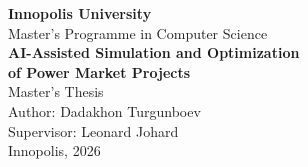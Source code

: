 \documentclass[14pt,a4paper]{extreport}   %
\begin{document}
\begin{titlepage}
\centering
{\Large\textbf{Innopolis University}\\[0.5em]
Master's Programme in Computer Science}\\[3em]
{\LARGE\textbf{AI-Assisted Simulation and Optimization\\
of Power Market Projects}}\\[3em]
{\large Master's Thesis}\\[4em]
{\large Author: Dadakhon Turgunboev}\\[1em]
{\large Supervisor: Leonard Johard}\\[4em]
{\large Innopolis, 2026}
\end{titlepage}


\newpage

\tableofcontents
\newpage

\listoffigures
{}
\newpage

\listoftables
{}
\newpage


\newpage













\printbibliography[heading=bibintoc]
\end{document}
